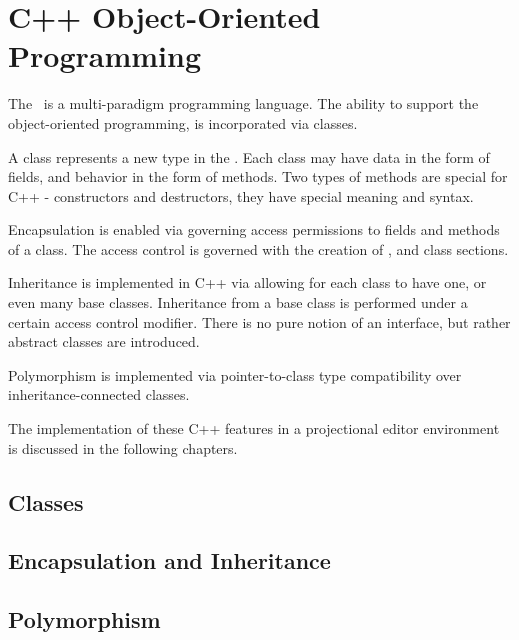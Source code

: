 \chapter{C++ Object-Oriented Programming}

The \cpppl\ is a multi-paradigm programming language. The ability to support the object-oriented programming,
is incorporated via classes. 

A class represents a new type in the \cpppl. Each class may have data in the 
form of fields, and behavior in the form of methods. Two types of methods are special for
C++ - constructors and destructors, they have special meaning and syntax.

Encapsulation is enabled via governing access permissions to fields and methods of a class.
The access control is governed with the creation of ,  and 
class sections.

Inheritance is implemented in C++ via allowing for each class to have one, or even many base classes.
Inheritance from a base class is performed under a certain access control modifier. There is no pure notion 
of an interface, but rather abstract classes are introduced.

Polymorphism is implemented via pointer-to-class type compatibility over inheritance-connected classes.

The implementation of these C++ features in a projectional editor environment is discussed in the
following chapters.


\section{Classes}
\label{section:classes}







\section{Encapsulation and Inheritance}

\section{Polymorphism}

